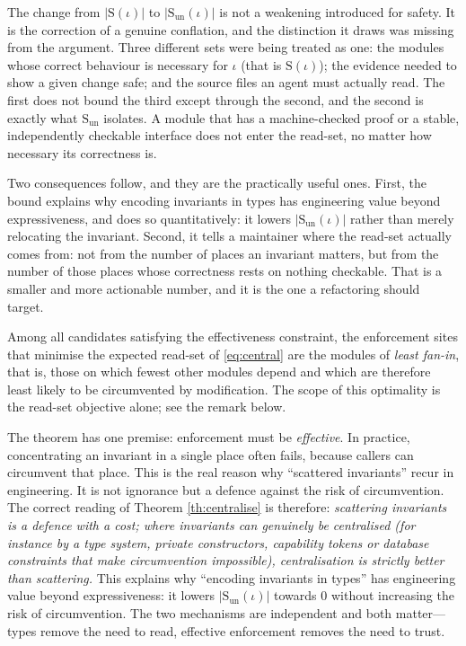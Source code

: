 The change from $|\mathrm{S}(\iota)|$ to $|\mathrm{S}_{\mathrm{un}}(\iota)|$ is not a weakening
introduced for safety. It is the correction of a genuine conflation, and the distinction it draws
was missing from the argument. Three different sets were being treated as one: the modules whose
correct behaviour is necessary for $\iota$ (that is $\mathrm{S}(\iota)$); the evidence needed to
show a given change safe; and the source files an agent must actually read. The first does not bound
the third except through the second, and the second is exactly what $\mathrm{S}_{\mathrm{un}}$
isolates. A module that has a machine-checked proof or a stable, independently checkable interface
does not enter the read-set, no matter how necessary its correctness is.

Two consequences follow, and they are the practically useful ones. First, the bound explains why
encoding invariants in types has engineering value beyond expressiveness, and does so quantitatively:
it lowers $|\mathrm{S}_{\mathrm{un}}(\iota)|$ rather than merely relocating the invariant. Second, it
tells a maintainer where the read-set actually comes from: not from the number of places an invariant
matters, but from the number of those places whose correctness rests on nothing checkable. That is a
smaller and more actionable number, and it is the one a refactoring should target.

\begin{corollary}\label{cor:site}
Among all candidates satisfying the effectiveness constraint, the enforcement sites that minimise
the expected read-set of \eqref{eq:central} are the modules of \emph{least fan-in}, that is, those on
which fewest other modules depend and which are therefore least likely to be circumvented by
modification. The scope of this optimality is the read-set objective alone; see the remark below.
\end{corollary}

\begin{remark}\label{rmk:central-limit}
The theorem has one premise: enforcement must be \emph{effective}. In practice,
concentrating an invariant in a single place often fails, because callers can circumvent
that place. This is the real reason why ``scattered invariants'' recur in engineering. It
is not ignorance but a defence against the risk of circumvention. The correct reading of
Theorem \ref{th:centralise} is therefore: \emph{scattering invariants is a defence with a
cost; where invariants can genuinely be centralised (for instance by a type system, private
constructors, capability tokens or database constraints that make circumvention impossible),
centralisation is strictly better than scattering.}
This explains why ``encoding invariants in types'' has engineering value beyond
expressiveness: it lowers $|\mathrm{S}_{\mathrm{un}}(\iota)|$ towards $0$ without increasing the risk
of circumvention. The two mechanisms are independent and both matter---types remove the need to read,
effective enforcement removes the need to trust.
\end{remark}

